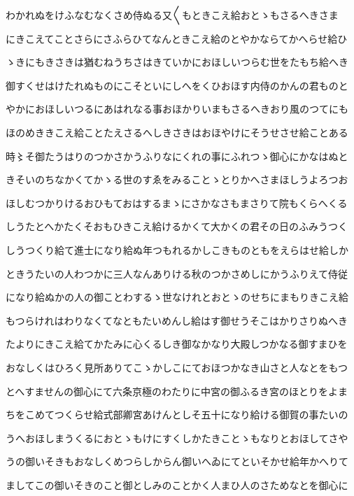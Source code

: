 \documentclass[a4paper,11pt,landscape]{ltjtarticle}
\begin{document}
\par\medskip
わかれぬをけふなむなくさめ侍ぬる又〱もときこえ給おとゝもさるへきさま
\par\medskip
にきこえてことさらにさふらひてなんときこえ給のとやかならてかへらせ給ひ
\par\medskip
ゝきにもきさきは猶むねうちさはきていかにおほしいつらむ世をたもち給へき
\par\medskip
御すくせはけたれぬものにこそといにしへをくひおほす内侍のかんの君ものと
\par\medskip
やかにおほしいつるにあはれなる事おほかりいまもさるへきおり風のつてにも
\par\medskip
ほのめききこえ給ことたえさるへしきさきはおほやけにそうせさせ給ことある
\par\medskip
時〻そ御たうはりのつかさかうふりなにくれの事にふれつゝ御心にかなはぬと
\par\medskip
きそいのちなかくてかゝる世のすゑをみることゝとりかへさまほしうよろつお
\par\medskip
ほしむつかりけるおひもておはするまゝにさかなさもまさりて院もくらへくる
\par\medskip
しうたとへかたくそおもひきこえ給けるかくて大かくの君その日のふみうつく
\par\medskip
しうつくり給て進士になり給ぬ年つもれるかしこきものともをえらはせ給しか
\par\medskip
ときうたいの人わつかに三人なんありける秋のつかさめしにかうふりえて侍従
\par\medskip
になり給ぬかの人の御ことわするゝ世なけれとおとゝのせちにまもりきこえ給
\par\medskip
もつらけれはわりなくてなともたいめんし給はす御せうそこはかりさりぬへき
\par\medskip
たよりにきこえ給てかたみに心くるしき御なかなり大殿しつかなる御すまひを
\par\medskip
おなしくはひろく見所ありてこゝかしこにておほつかなき山さと人なとをもつ
\par\medskip
とへすませんの御心にて六条京極のわたりに中宮の御ふるき宮のほとりをよま
\par\medskip
ちをこめてつくらせ給式部卿宮あけんとしそ五十になり給ける御賀の事たいの
\par\medskip
うへおほしまうくるにおとゝもけにすくしかたきことゝもなりとおほしてさや
\par\medskip
うの御いそきもおなしくめつらしからん御いへゐにてといそかせ給年かへりて
\par\medskip
ましてこの御いそきのこと御としみのことかく人まひ人のさためなとを御心に
\end{document}
